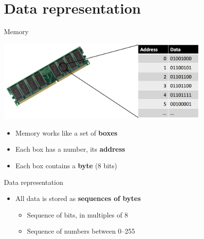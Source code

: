 \part{Data representation}
\frame{\partpage}

\begin{frame}{Memory}
	\pause
	\begin{center}
		\includegraphics[width=0.8\textwidth]{memory}
	\end{center}
	\begin{itemize}
		\item Memory works like a set of \textbf{boxes}
		\pause\item Each box has a number, its \textbf{address}
		\pause\item Each box contains a \textbf{byte} (8 bits)
	\end{itemize}
\end{frame}

\begin{frame}{Data representation} 
	\begin{itemize}
		\pause\item All data is stored as \textbf{sequences of bytes}
			\begin{itemize}
				\pause\item Sequence of bits, in multiples of 8
				\pause\item Sequence of numbers between 0--255
			\end{itemize}
	\end{itemize}
\end{frame}

